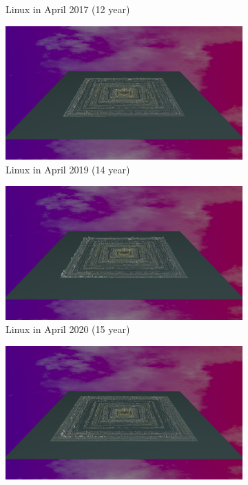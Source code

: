 \begin{figure}[h!]
\begin{subfigure}{0.48\textwidth}
        \caption{Linux in April 2017 (12 year)} 
        \label{fig:Linux_V7_S3}
    \end{subfigure}\hspace*{\fill}
    \begin{subfigure}{0.48\textwidth}
        \includegraphics[width=\linewidth]{Libreoffice/Animation014.png}
        \caption{Linux in April 2019  (14 year)} 
        \label{fig:Linux_V7_S4}
    \end{subfigure}
    \medskip
    \begin{subfigure}{0.48\textwidth}
        \includegraphics[width=\linewidth]{Libreoffice/Animation015.png}
        \caption{Linux in April 2020 (15 year)} 
        \label{fig:Linux_V7_S5}
    \end{subfigure}\hspace*{\fill}
    \begin{subfigure}{0.48\textwidth}
        \includegraphics[width=\linewidth]{Libreoffice/Animation017.png}

\end{subfigure}
\end{figure}
